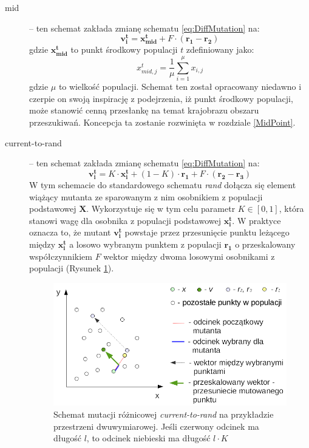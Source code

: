 \documentclass[12pt,a4paper]{report}
\begin{document}
{{{{\begin{description}
\item[mid] \cite{DEmid} -- ten schemat zakłada zmianę schematu \ref{eq:DiffMutation} na:
\begin{equation}
\mathbf{v_i^{t}} = \mathbf{x_{mid}^t} + F \cdot (\mathbf{r_{1}} - \mathbf{r_{2}})
\end{equation}
gdzie $\mathbf{x_{mid}^t}$ to punkt środkowy populacji $t$ zdefiniowany jako:
\begin{equation}
x_{mid,j}^t = \frac{1}{\mu}\sum_{i=1}^\mu{x_{i,j}}
\end{equation}
gdzie $\mu$ to wielkość populacji. Schemat ten został opracowany niedawno i czerpie on swoją inspirację z podejrzenia, iż punkt środkowy populacji, może stanowić cenną przesłankę na temat krajobrazu obszaru przeszukiwań. Koncepcja ta zostanie rozwinięta w rozdziale \ref{MidPoint}.

\item[current-to-rand] \cite{PracticalInsights} -- ten schemat zakłada zmianę schematu \ref{eq:DiffMutation} na:
\begin{equation}
 \mathbf{v_i^{t}} = K \cdot \mathbf{x_i^t} + (1 - K) \cdot \mathbf{r_{1}} + F \cdot (\mathbf{r_{2}} - \mathbf{r_{3}})
\end{equation}
W tym schemacie do standardowego schematu \emph{rand} dołącza się element wiążący mutanta ze sparowanym z nim osobnikiem z populacji podstawowej $\mathbf{X}$. Wykorzystuje się w tym celu parametr $K \in [0, 1]$, która stanowi wagę dla osobnika z populacji podstawowej $\mathbf{x_i^t}$. W praktyce oznacza to, że mutant $\mathbf{v_i^t}$ powstaje przez przesunięcie punktu leżącego między $\mathbf{x_i^t}$ a losowo wybranym punktem z populacji $\mathbf{r_1}$ o przeskalowany współczynnikiem $F$ wektor między dwoma losowymi osobnikami z populacji (Rysunek \ref{current-to-rand-img}).

\begin{figure}[h]
\begin{center}\includegraphics[scale=0.8]{img/current-to-rand-mutation.png}\end{center}
\caption{Schemat mutacji różnicowej \emph{current-to-rand} na przykładzie przestrzeni dwuwymiarowej. Jeśli czerwony odcinek ma długość $l$, to odcinek niebieski ma długość $l \cdot K$}
\label{current-to-rand-img}
\end{figure}



\end{description}}}}}
\end{document}
